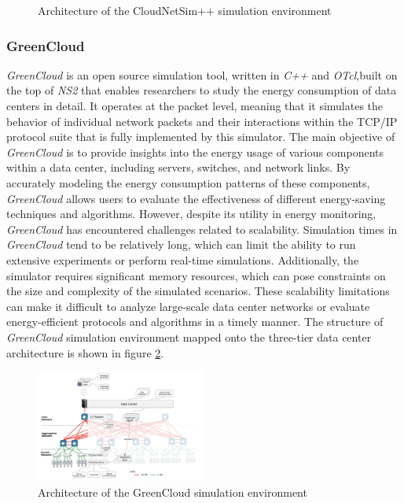 {\begin{figure}[h]
    \caption{Architecture of the CloudNetSim++ simulation environment}
    \label{fig:cloudnetsim++_arch}
\end{figure}\subsubsection*{GreenCloud}
\emph{GreenCloud} \cite{kliazovich2012greencloud} is an open source simulation tool, written in \emph{C++} and \emph{OTcl},built on the top of \emph{NS2} that enables researchers to study the energy consumption of data centers in detail. It operates at the packet level, meaning that it simulates the behavior of individual network packets and their interactions within the TCP/IP protocol suite that is fully implemented by this simulator. The main objective of \emph{GreenCloud} is to provide insights into the energy usage of various components within a data center, including servers, switches, and network links. By accurately modeling the energy consumption patterns of these components, \emph{GreenCloud} allows users to evaluate the effectiveness of different energy-saving techniques and algorithms. However, despite its utility in energy monitoring, \emph{GreenCloud} has encountered challenges related to scalability. Simulation times in \emph{GreenCloud} tend to be relatively long, which can limit the ability to run extensive experiments or perform real-time simulations. Additionally, the simulator requires significant memory resources, which can pose constraints on the size and complexity of the simulated scenarios. These scalability limitations can make it difficult to analyze large-scale data center networks or evaluate energy-efficient protocols and algorithms in a timely manner. \cite{mansouri2020cloud}
The structure of \emph{GreenCloud} simulation environment mapped onto the three-tier data center architecture is shown in figure \ref{fig:greencloud_arch}. 
\begin{figure}[h]
    \centering
    \includegraphics[width=0.5\textwidth]{capitoli/images/greencloud_arch.png}
    \caption{Architecture of the GreenCloud simulation environment}
    \label{fig:greencloud_arch}
\end{figure}
}
